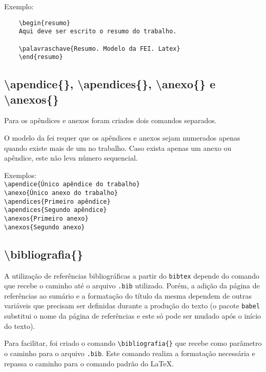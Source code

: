 \documentclass{fei}
\begin{document}
    Exemplo:
    \begin{verbatim}
    \begin{resumo}
    Aqui deve ser escrito o resumo do trabalho.

    \palavraschave{Resumo. Modelo da FEI. Latex}
    \end{resumo}
    \end{verbatim}
    
    \subsection{\textbackslash apendice\{\}, \textbackslash apendices\{\}, \textbackslash anexo\{\} e \textbackslash anexos\{\}}
    Para os apêndices e anexos foram criados dois comandos separados.

    O modelo da \gls{fei} requer que os apêndices e anexos sejam numerados apenas quando existe mais de um no trabalho. Caso exista apenas um anexo ou apêndice, este não leva número sequencial.

    Exemplos: \\
    \verb+\apendice{Único apêndice do trabalho}+ \\
    \verb+\anexo{Único anexo do trabalho}+ \\

    \noindent{}
    \verb+\apendices{Primeiro apêndice}+\\
    \verb+\apendices{Segundo apêndice}+\\

    \noindent{}
    \verb+\anexos{Primeiro anexo}+\\
    \verb+\anexos{Segundo anexo}+\\

    \subsection{\textbackslash bibliografia\{\}}
    A utilização de referências bibliográficas a partir do \texttt{bibtex} depende do comando \verb++ que recebe o caminho até o arquivo \texttt{.bib} utilizado. Porém, a adição da página de referências ao sumário e a formatação do título da mesma dependem de outras variáveis que precisam ser definidas durante a produção do texto (o pacote \texttt{babel} substitui o nome da página de referências e este só pode ser mudado após o início do texto).

    Para facilitar, foi criado o comando \verb+\bibliografia{}+ que recebe como parâmetro o caminho para o arquivo \texttt{.bib}. Este comando realiza a formatação necessária e repassa o caminho para o comando \verb++ padrão do \LaTeX.
\end{document}
